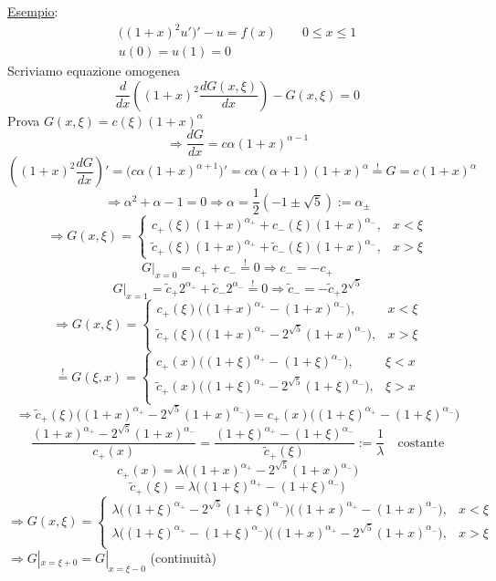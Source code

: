 \documentclass[a4paper,11pt]{report}
\begin{document}
\underline{Esempio}: 
\[
\begin{gathered}
\big((1+x)^2u'\big)'-u=f(x) \qquad 0\leq x\leq1\\
u(0)=u(1)=0
\end{gathered}
\]
Scriviamo equazione omogenea
\[
\frac{d}{dx}\left((1+x)^2 \frac{dG(x,\xi)}{dx}\right)-G(x,\xi)=0
\]
Prova $G(x,\xi)=c(\xi)(1+x)^\alpha$
\[ \Rightarrow \frac{dG}{dx}=c\alpha(1+x)^{\alpha-1}
\]
\[
\left((1+x)^2 \frac{dG}{dx}\right)'=\big(c\alpha(1+x)^{\alpha+1}\big)'
=c\alpha(\alpha +1)(1+x)^\alpha \overset{!}{=} G = c(1+x)^\alpha
\]
\[
\Rightarrow \alpha^2 + \alpha - 1 =0 \Rightarrow \alpha=\frac{1}{2}(-1\pm \sqrt{5}):=\alpha_\pm
\]
\[
\Rightarrow  G(x,\xi)=
\begin{cases}
c_+(\xi)(1+x)^{\alpha_+} + c_-(\xi)(1+x)^{\alpha_-}, & x<\xi \\
\tilde{c}_+(\xi)(1+x)^{\alpha_+} + \tilde{c}_-(\xi)(1+x)^{\alpha_-}, & x>\xi
\end{cases}
\]
\[
G|_{x=0}=c_+ + c_- \overset{!}{=} 0 \Rightarrow c_- = -c_+
\]
\[
G|_{x=1}=\tilde{c}_+ 2^{\alpha_+} + \tilde{c}_-2^{\alpha_-} \overset{!}{=} 0 \Rightarrow \tilde{c}_- = -\tilde{c}_+2^{\sqrt{5}} 
\]
\[
\Rightarrow G(x,\xi)=
\begin{cases}
c_+(\xi) \big((1+x)^{\alpha_+} - (1+x)^{\alpha_-} \big), & x<\xi \\
\tilde{c}_+(\xi) \big((1+x)^{\alpha_+} - 2^{\sqrt{5}} (1+x)^{\alpha_-} \big), & x>\xi \\
\end{cases}
\]
\[
\overset{!}{=} G(\xi, x)=
\begin{cases}
c_+(x) \big((1+\xi)^{\alpha_+} - (1+\xi)^{\alpha_-} \big), & \xi<x \\
\tilde{c}_+(x) \big((1+\xi)^{\alpha_+} - 2^{\sqrt{5}} (1+\xi)^{\alpha_-} \big), & \xi>x \\
\end{cases}
\]
\[
\Rightarrow \tilde{c}_+(\xi) \big((1+x)^{\alpha_+} - 2^{\sqrt{5}} (1+x)^{\alpha_-} \big) = c_+(x) \big((1+\xi)^{\alpha_+} - (1+\xi)^{\alpha_-} \big)
\]
\[
\frac{(1+x)^{\alpha_+} - 2^{\sqrt{5}} (1+x)^{\alpha_-} }{c_+(x)}=\frac{(1+\xi)^{\alpha_+} - (1+\xi)^{\alpha_-}}{\tilde{c}_+(\xi)}:=\frac{1}{\lambda} \quad\text{costante}
\]
\[
c_+(x)=\lambda \big((1+x)^{\alpha_+} - 2^{\sqrt{5}} (1+x)^{\alpha_-} \big)
\]
\[
\tilde{c}_+(\xi)=\lambda \big((1+\xi)^{\alpha_+} - (1+\xi)^{\alpha_-} \big)
\]
\[
\Rightarrow G(x,\xi)=
\begin{cases}
\lambda \big( (1+\xi)^{\alpha_+}-2^{\sqrt{5}}(1+\xi)^{\alpha_-}\big) \big( (1+x)^{\alpha_+}-(1+x)^{\alpha_-}\big), & x<\xi \\
\lambda \big( (1+\xi)^{\alpha_+}-(1+\xi)^{\alpha_-}\big) \big( (1+x)^{\alpha_+}-2^{\sqrt{5}}(1+x)^{\alpha_-} \big), & x>\xi \\
\end{cases}
\]
$\Rightarrow G|_{x=\xi+0}=G|_{x=\xi-0}$ (continuit\`a)
\end{document}
